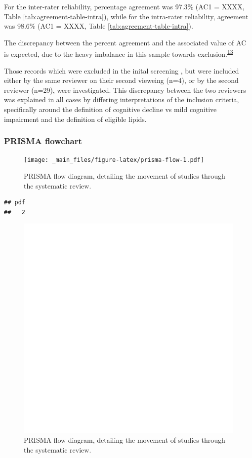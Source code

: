 \documentclass[a4paper, nobind]{templates/ociamthesis}
\begin{document}
For the inter-rater reliability, percentage agreement was 97.3\% (AC1 = XXXX, Table \ref{tab:agreement-table-intra}), while for the intra-rater reliability, agreement was 98.6\% (AC1 = XXXX, Table \ref{tab:agreement-table-intra}).

The discrepancy between the percent agreement and the associated value of AC is expected, due to the heavy imbalance in this sample towards exclusion.\textsuperscript{\protect\hyperlink{ref-feinstein1990}{13}}

Those records which were excluded in the inital screening , but were included either by the same reviewer on their second vieweing (n=4), or by the second reviewer (n=29), were investigated. This discrepancy between the two reviewers was explained in all cases by differing interpretations of the inclusion criteria, specifically around the definition of cognitive decline vs mild cognitive impairment and the definition of eligible lipids.

\hypertarget{prisma-flowchart}{%
\subsubsection{PRISMA flowchart}\label{prisma-flowchart}}

\begin{figure}
\centering
\texttt{[image: \_main\_files/figure-latex/prisma-flow-1.pdf]}
\caption{\label{fig:prisma-flow}PRISMA flow diagram, detailing the movement of studies through the systematic review.}
\end{figure}

\begin{verbatim}
## pdf 
##   2
\end{verbatim}

\begin{figure}
\includegraphics[width=6.67in]{figures/sys-rev/prismaflow} \caption{PRISMA flow diagram, detailing the movement of studies through the systematic review.}\label{fig:prisma-flow}
\end{figure}
\end{document}
